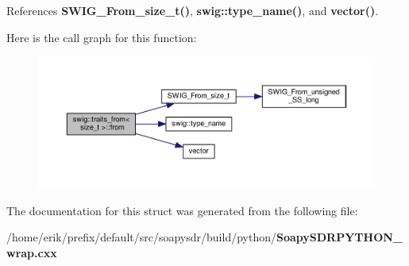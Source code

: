 References {\bf S\+W\+I\+G\+\_\+\+From\+\_\+size\+\_\+t()}, {\bf swig\+::type\+\_\+name()}, and {\bf vector()}.



Here is the call graph for this function\+:
\nopagebreak
\begin{figure}[H]
\begin{center}
\leavevmode
\includegraphics[width=350pt]{d1/d0f/structswig_1_1traits__from_3_01size__t_01_4_a25ca8602065b79b611dee7905130d2ec_cgraph}
\end{center}
\end{figure}




The documentation for this struct was generated from the following file\+:\begin{DoxyCompactItemize}
\item 
/home/erik/prefix/default/src/soapysdr/build/python/{\bf Soapy\+S\+D\+R\+P\+Y\+T\+H\+O\+N\+\_\+wrap.\+cxx}\end{DoxyCompactItemize}
